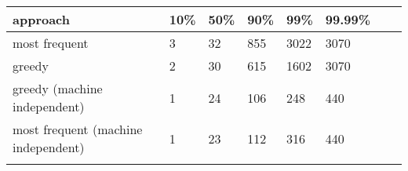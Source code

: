 \begin{tabular}{l l l l l l l l}
\toprule{}
approach & 10\% & 50\% & 90\% & 99\% & 99.99\%  \\
\midrule{}%
most frequent & 3 & 32 & 855 & 3022 & 3070 \\
greedy & 2 & 30 & 615 & 1602 & 3070 \\
greedy (machine independent) & 1 & 24 & 106 & 248 & 440 \\
most frequent (machine independent) & 1 & 23 & 112 & 316 & 440 \\
\bottomrule{}
\end{tabular}

